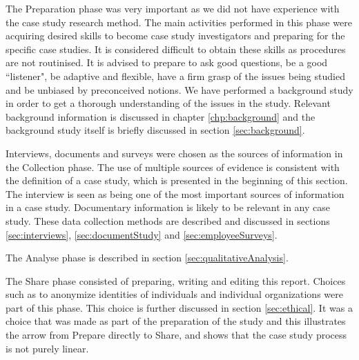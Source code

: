 The Preparation phase was very important as we did not have experience with the case study research method. The main activities performed in this phase were acquiring desired skills to become case study investigators and preparing for the specific case studies. It is considered difficult to obtain these skills as procedures are not routinised. It is advised to prepare to ask good questions, be a good ``listener", be adaptive and flexible, have a firm grasp of the issues being studied and be unbiased by preconceived notions. We have performed a background study in order to get a thorough understanding of the issues in the study. Relevant background information is discussed in chapter \ref{chp:background} and the background study itself is briefly discussed in section \ref{sec:background}. %

Interviews, documents and surveys were chosen as the sources of information in the Collection phase. The use of multiple sources of evidence is consistent with the definition of a case study, which is presented in the beginning of this section. The interview is seen as being one of the most important sources of information in a case study. Documentary information is likely to be relevant in any case study. These data collection methods are described and discussed in sections \ref{sec:interviews}, \ref{sec:documentStudy} and \ref{sec:employeeSurveys}.

The Analyse phase is described in section \ref{sec:qualitativeAnalysis}.

The Share phase consisted of preparing, writing and editing this report. Choices such as to anonymize identities of individuals and individual organizations were part of this phase. This choice is further discussed in section \ref{sec:ethical}. It was a choice that was made as part of the preparation of the study and this illustrates the arrow from Prepare directly to Share, and shows that the case study process is not purely linear. 